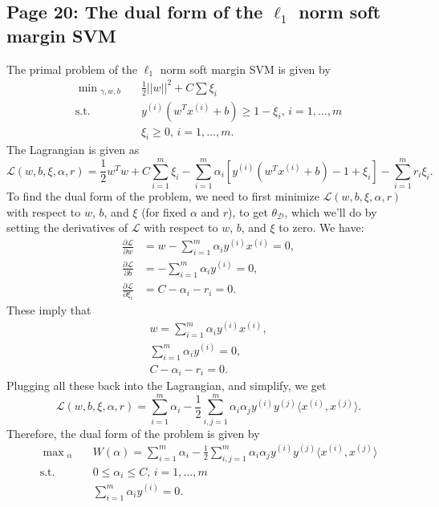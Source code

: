 \documentclass{article}
\begin{document}
\subsection{Page 20: The dual form of the $\ell_1$ norm soft margin SVM}
The primal problem of the $\ell_1$ norm soft margin SVM is given by
\[
\begin{split}
\min\!{}_{\gamma,w,b} & \quad \frac{1}{2}||w||^2+C\sum\xi_i\\
\text{s.t.} & \quad y^{(i)}(w^Tx^{(i)}+b)\geq 1-\xi_i, \, i=1,\ldots,m\\
& \quad \xi_i\geq 0, \, i=1,\ldots,m.
\end{split}
\]
The Lagrangian is given as
\[
\mathcal{L}(w,b,\xi,\alpha,r)=\frac{1}{2}w^Tw+C\sum_{i=1}^m\xi_i-\sum_{i=1}^m \alpha_i[y^{(i)}(w^Tx^{(i)}+b)-1+\xi_i]-\sum_{i=1}^m r_i\xi_i.
\]
To find the dual form of the problem, we need to first minimize $\mathcal{L}(w,b,\xi,\alpha,r)$ with respect to $w$, $b$, and $\xi$ (for fixed $\alpha$ and $r$), to get $\theta_{\mathcal{D}}$, which we'll do by setting the derivatives of $\mathcal{L}$ with respect to $w$, $b$, and $\xi$ to zero. We have:
\[
\begin{split}
\frac{\partial \mathcal{L}}{\partial w}&=w-\sum_{i=1}^m \alpha_iy^{(i)}x^{(i)}=0,\\
\frac{\partial \mathcal{L}}{\partial b}&=-\sum_{i=1}^m \alpha_iy^{(i)}=0,\\
\frac{\partial \mathcal{L}}{\partial \xi_i}&=C-\alpha_i-r_i=0.
\end{split}
\]
These imply that
\begin{gather}
w=\sum_{i=1}^m \alpha_iy^{(i)}x^{(i)},\\
\sum_{i=1}^m \alpha_iy^{(i)}=0,\\
C-\alpha_i-r_i=0.
\end{gather}
Plugging all these back into the Lagrangian, and simplify, we get
\[
\mathcal{L}(w,b,\xi,\alpha,r)=\sum_{i=1}^m \alpha_i-\frac{1}{2}\sum_{i,j=1}^m \alpha_i\alpha_j y^{(i)}y^{(j)}\langle x^{(i)},x^{(j)}\rangle.
\]
Therefore, the dual form of the problem is given by
\[
\begin{split}
\max\!{}_{\alpha} & \quad W(\alpha)=\sum_{i=1}^m \alpha_i-\frac{1}{2}\sum_{i,j=1}^m \alpha_i\alpha_j y^{(i)}y^{(j)}\langle x^{(i)},x^{(j)}\rangle\\
\text{s.t.} & \quad 0\leq\alpha_i\leq C, \, i=1,\ldots,m\\
& \quad \sum_{i=1}^m \alpha_iy^{(i)}=0.
\end{split}
\]
\end{document}

